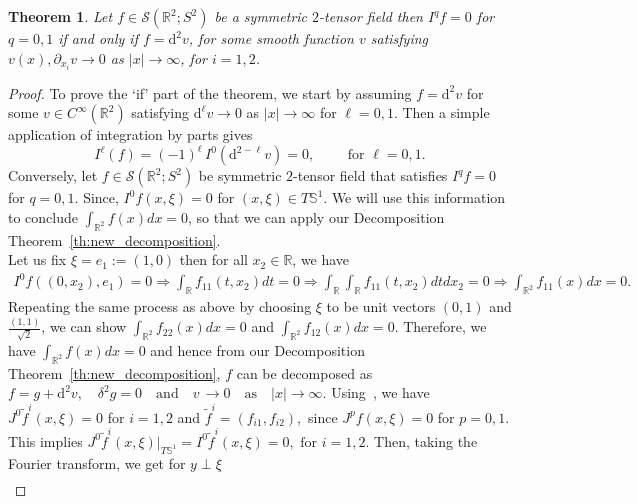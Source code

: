 \documentclass[11pt]{article}
\newcommand{\D}{\mathrm{d}}
\newcommand{\Rb}{\mathbb{R}}
\newcommand{\Sb}{\mathbb{S}}
\renewcommand{\d}{\mathrm{d}}
\newtheorem{theorem}{Theorem}[]
\begin{document}
\begin{theorem}\label{th:injectivity result}
Let $ f \in \mathcal{S}(\mathbb{R}^2;S^2)$ be a symmetric $2$-tensor field then $I^q f = 0$ for  $ q = 0, 1$ if and only if $f = \D^2 v$, for some smooth function $v$  satisfying $v(x) , \partial_{x_i} v \rightarrow 0$ as $|x| \rightarrow  \infty$, for $i=1,2$.
\end{theorem}
\begin{proof}
To prove the `if' part of the theorem, we start by assuming $ f=\d^{2} v$ for some $ v \in C^{\infty}(\Rb^2)$ satisfying   $\d^{\ell}v \rightarrow 0 $ as $ |x| \rightarrow \infty$ for $ \ell=0,1$. Then a simple application of integration by parts  gives
    $$ I^{\ell}(f)= (-1)^{\ell}\,I^0(\d^{2-\ell}v)=0, \qquad \mbox{ for } \ell = 0 , 1.$$ 
Conversely, let $ f\in \mathcal{S}(\mathbb{R}^2;S^{2}) $ be symmetric $2$-tensor field that satisfies $ I^{q}f =0$ for $q=0,1$. Since, $I^0f (x, \xi) = 0$ for $(x, \xi) \in T\Sb^1$. We will use this information to conclude $\int_{\Rb^2} f(x) dx = 0$, so that we can apply our Decomposition Theorem~\ref{th:new_decomposition}. 
\vspace{2mm}\\
Let us fix $\xi = e_1 := (1, 0)$ then for all $x_2 \in \Rb$, we have 
\begin{align*}
    I^0f ((0,x_2), e_1) = 0 \Longrightarrow  \int_\Rb f_{11}(t, x_2)dt = 0 \Longrightarrow  \int_\Rb\int_\Rb f_{11}(t, x_2)dtdx_2 = 0 \Longrightarrow  \int_{\Rb^2}f_{11}(x)dx = 0. 
\end{align*}
Repeating the same process as above by choosing $\xi$ to be unit vectors $(0, 1)$ and $\frac{(1, 1)}{\sqrt{2}}$, we can show $ \int_{\Rb^2}f_{22}(x)dx = 0$  and $  \int_{\Rb^2}f_{12}(x)dx = 0.$
Therefore, we have $\int_{\Rb^2}f(x)dx = 0$ and hence from our Decomposition Theorem~\ref{th:new_decomposition}, $f$ can be decomposed as $ f=g+\d^{2}v,\quad \delta^{2} g=0 \quad \mbox{and}\quad  v\, \rightarrow 0 \quad \mbox{as} \quad |x| \rightarrow \infty.$
Using~\cite[Lemma 4.2]{Rohit_Suman}, we have  $J^0 \tilde{f}^i (x, \xi) = 0$ for $ i = 1, 2$ and $\tilde{f}^i = (f_{i1}, f_{i2}),$ since $J^p f(x,\xi) =0$ for $p=0,1$.   
This implies  $ J^0 \tilde{f}^i (x, \xi)|_{T\mathbb{S}^1}= I^0 \tilde{f}^i (x, \xi) = 0, \mbox{ for } i = 1, 2.$
Then, taking the Fourier transform, we get for $y \perp \xi$
\begin{align*}

\end{align*}
\end{proof}
\end{document}
